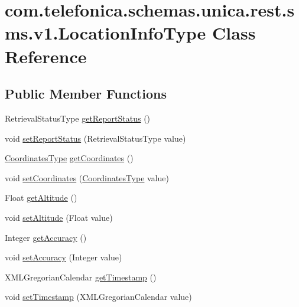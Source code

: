 \hypertarget{classcom_1_1telefonica_1_1schemas_1_1unica_1_1rest_1_1sms_1_1v1_1_1LocationInfoType}{
\section{com.telefonica.schemas.unica.rest.sms.v1.LocationInfoType Class Reference}
\label{classcom_1_1telefonica_1_1schemas_1_1unica_1_1rest_1_1sms_1_1v1_1_1LocationInfoType}
}
\subsection*{Public Member Functions}
\begin{DoxyCompactItemize}
\item 
RetrievalStatusType \hyperlink{classcom_1_1telefonica_1_1schemas_1_1unica_1_1rest_1_1sms_1_1v1_1_1LocationInfoType_a4334842a91ec2b9f3dee9ea99785bca5}{getReportStatus} ()
\item 
void \hyperlink{classcom_1_1telefonica_1_1schemas_1_1unica_1_1rest_1_1sms_1_1v1_1_1LocationInfoType_a23fc284509c9e85a4541b1dd39cfe414}{setReportStatus} (RetrievalStatusType value)
\item 
\hyperlink{classcom_1_1telefonica_1_1schemas_1_1unica_1_1rest_1_1sms_1_1v1_1_1CoordinatesType}{CoordinatesType} \hyperlink{classcom_1_1telefonica_1_1schemas_1_1unica_1_1rest_1_1sms_1_1v1_1_1LocationInfoType_a9d6a89b3f3399e0f675455e821019f09}{getCoordinates} ()
\item 
void \hyperlink{classcom_1_1telefonica_1_1schemas_1_1unica_1_1rest_1_1sms_1_1v1_1_1LocationInfoType_afba25368c9cbf055f2e1ad846d19a6ab}{setCoordinates} (\hyperlink{classcom_1_1telefonica_1_1schemas_1_1unica_1_1rest_1_1sms_1_1v1_1_1CoordinatesType}{CoordinatesType} value)
\item 
Float \hyperlink{classcom_1_1telefonica_1_1schemas_1_1unica_1_1rest_1_1sms_1_1v1_1_1LocationInfoType_a1f1083337859e3bce08c9f5637432bac}{getAltitude} ()
\item 
void \hyperlink{classcom_1_1telefonica_1_1schemas_1_1unica_1_1rest_1_1sms_1_1v1_1_1LocationInfoType_a75cd8e6da7f10e7482c92fece059bb1e}{setAltitude} (Float value)
\item 
Integer \hyperlink{classcom_1_1telefonica_1_1schemas_1_1unica_1_1rest_1_1sms_1_1v1_1_1LocationInfoType_a6567757c8d2cfdd5a0f55eca01ec5953}{getAccuracy} ()
\item 
void \hyperlink{classcom_1_1telefonica_1_1schemas_1_1unica_1_1rest_1_1sms_1_1v1_1_1LocationInfoType_a033da7f10c8c3721a4bfe2e3e8dd123e}{setAccuracy} (Integer value)
\item 
XMLGregorianCalendar \hyperlink{classcom_1_1telefonica_1_1schemas_1_1unica_1_1rest_1_1sms_1_1v1_1_1LocationInfoType_a8045b7bb4dddfef448000443de6d9007}{getTimestamp} ()
\item 
void \hyperlink{classcom_1_1telefonica_1_1schemas_1_1unica_1_1rest_1_1sms_1_1v1_1_1LocationInfoType_ab088cae667d75b3645c1f1cdd30eb290}{setTimestamp} (XMLGregorianCalendar value)
\end{DoxyCompactItemize}

